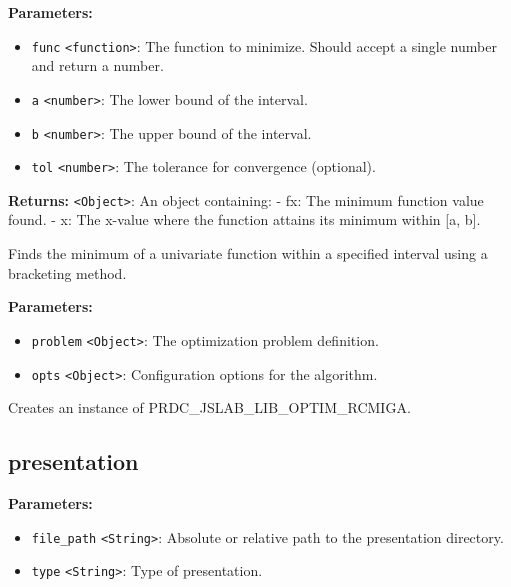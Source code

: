 \documentclass[12pt,a4paper]{article}
\begin{document}
\noindent \textbf{Parameters:}
\begin{itemize}
  \item \texttt{func} \texttt{<function>}: The function to minimize. Should accept a single number and return a number.
  \item \texttt{a} \texttt{<number>}: The lower bound of the interval.
  \item \texttt{b} \texttt{<number>}: The upper bound of the interval.
  \item \texttt{tol} \texttt{<number>}: The tolerance for convergence (optional).
\end{itemize}

\noindent \textbf{Returns:} \texttt{<Object>}: An object containing:
- \textasciigrave{}fx\textasciigrave{}: The minimum function value found.
- \textasciigrave{}x\textasciigrave{}: The x-value where the function attains its minimum within [a, b].

\noindent Finds the minimum of a univariate function within a specified interval using a bracketing method.

\vspace{5mm}
\noindent {}


\noindent \textbf{Parameters:}
\begin{itemize}
  \item \texttt{problem} \texttt{<Object>}: The optimization problem definition.
  \item \texttt{opts} \texttt{<Object>}: Configuration options for the algorithm.
\end{itemize}

\noindent Creates an instance of PRDC\_JSLAB\_LIB\_OPTIM\_RCMIGA.


\subsection{presentation}
\vspace{5mm}
\noindent {}


\noindent \textbf{Parameters:}
\begin{itemize}
  \item \texttt{file\_path} \texttt{<String>}: Absolute or relative path to the presentation directory.
  \item \texttt{type} \texttt{<String>}: Type of presentation.
\end{itemize}
\end{document}
